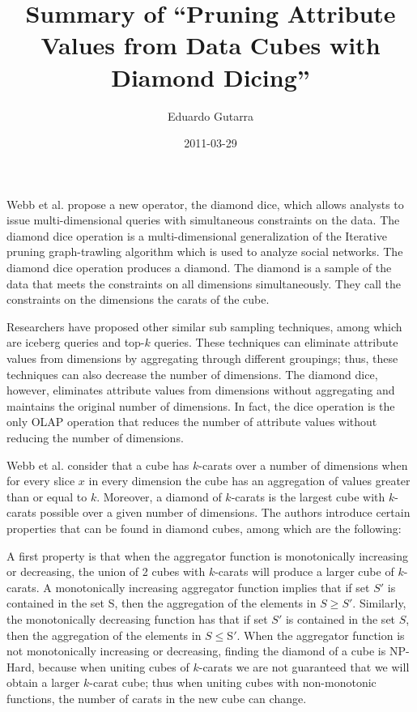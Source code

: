 \documentclass[12pt]{article}
\title{Summary of “Pruning Attribute Values from Data Cubes with Diamond Dicing”}
\author{Eduardo Gutarra}
\date{2011-03-29}
\begin{document}
\ifpdf
{}
\else
{}
\fi

\maketitle


Webb et al. propose a new operator, the diamond dice, which allows analysts to issue multi-dimensional queries with simultaneous constraints on the data. The
diamond dice operation is a multi-dimensional generalization of the Iterative pruning graph-trawling algorithm which is used to analyze social networks. The
diamond dice operation produces a diamond. The diamond is a sample of the data that meets the constraints on all dimensions simultaneously. They call the
constraints on the dimensions the carats of the cube. 

Researchers have proposed other similar sub sampling techniques, among which are iceberg queries and top-$k$ queries. These techniques can eliminate attribute
values from dimensions by aggregating through different groupings; thus, these techniques can also decrease the number of dimensions. The diamond dice, however,
eliminates attribute values from dimensions without aggregating and maintains the original number of dimensions. In fact, the dice operation is the only OLAP
operation that reduces the number of attribute values without reducing the number of dimensions.

Webb et al. consider that a cube has $k$-carats over a number of dimensions when for every slice $x$ in every dimension the cube has an aggregation of values
greater than or equal to $k$. Moreover, a diamond of $k$-carats is the largest cube with $k$-carats possible over a given number of dimensions. The authors
introduce certain properties that can be found in diamond cubes, among which are the following:

A first property is that when the aggregator function is monotonically increasing or decreasing, the union of 2 cubes with $k$-carats will produce a larger cube
of $k$-carats. A monotonically increasing aggregator function implies that if set $S'$ is contained in the set S, then the aggregation of the elements in $S\geq S'$. Similarly, the monotonically decreasing function has that if set $S'$ is contained in the set $S$, then the aggregation of the elements in $S \leq $S$'$.
When the aggregator function is not monotonically increasing or decreasing, finding the diamond of a cube is NP-Hard, because when uniting cubes of $k$-carats we
are not guaranteed that we will obtain a larger $k$-carat cube; thus when uniting cubes with non-monotonic functions, the number of carats in the new cube can
change.
\end{document}
